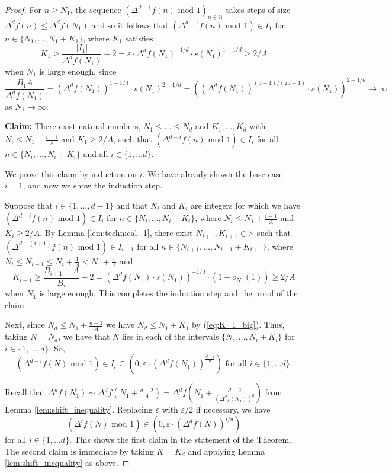\documentclass[12pt]{article}
\theoremstyle{plain} %
\theoremstyle{definition} %
\theoremstyle{plain}
\theoremstyle{plain}
\numberwithin{equation}{section}
\newcommand{\N}{\mathbb{N}}
\renewcommand{\epsilon}{\varepsilon}
\renewcommand{\leq}{\leqslant}
\renewcommand{\geq}{\geqslant}
\renewcommand{\subset}{\subseteq}
\newcommand{\1}{\mathbbm{1}}
\newcommand{\oo}{\infty}
\begin{document}
\begin{proof}
For $n\geq N_1$, the sequence $(\Delta^{d-1}f(n) \text{ mod } 1)_{n\in \N}$ takes steps of size $\Delta^{d}f(n)\leq \Delta^{d}f(N_1)$ and so it follows that $(\Delta^{d-1}f(n) \text{ mod } 1) \in I_{1}$ for $n\in \{N_1,\dots, N_1+K_1\}$, where $K_1$ satisfies
\begin{equation}\label{eq:K_1_big}
K_1\geq \frac{ |I_{1}|}{\Delta^{d}f(N_1)}-2 = \epsilon\cdot {\Delta^{d}f(N_1)^{-1/d}}\cdot s(N_1)^{1-1/d} \geq 2/ A
\end{equation}
when $N_1$ is large enough, since 
\[
\frac{B_1 A}{\Delta^{d}f(N_1)}= (\Delta^{d}f(N_1))^{1-1/d}\cdot s(N_1)^{2-1/d} = ((\Delta^{d}f(N_1))^{(d-1)/(2d-1)}\cdot s(N_1))^{2-1/d}\to \oo
\]
as $N_1\to\oo$.


\textbf{Claim:} There exist natural numbers, $N_1\leq \dots \leq N_{d}$ and $K_1,\dots, K_{d}$ with $N_{i}\leq N_1+\frac{i-1}{A}$ and $K_1\geq 2/A$, such that $(\Delta^{d-i}f(n)\text{ mod } 1)\in  I_{i}$ for all $n\in \{N_i,\dots, N_i+K_i\}$ and all $i\in\{1,\dots d\}$.


We prove this claim by induction on $i$. We have already shown the base case $i=1$, and now we show the induction step.

Suppose that $i\in\{1,\dots, d-1\}$ and that $N_i$ and $K_i$ are integers for which we have $(\Delta^{d-i}f(n) \text{ mod } 1) \in I_{i}$ for $n\in \{N_i,\dots, N_i+K_i\}$, where $N_i\leq N_{1}+\frac{i-1}{A}$ and $K_i\geq 2/A$. By Lemma \ref{lem:technical_1}, there exist $N_{i+1},K_{i+1}\in \N$ such that $(\Delta^{d-(i+1)}f(n) \text{ mod } 1) \in I_{i+1}$ for all $n\in\{N_{i+1},\dots, N_{i+1}+K_{i+1}\}$, where $N_i\leq N_{i+1}\leq N_{i}+\frac{1}{A}< N_{1}+\frac{i}{A}$ and 
\begin{equation}\label{eq:length_of_interval}
K_{i+1}\geq \frac{ B_{i+1}-A}{B_i}-2 =  \left(\Delta^{d}f(N_1)\cdot s(N_1)\right)^{-1/d} \cdot (1+o_{N_1}(1))\geq 2/A
\end{equation}
when $N_1$ is large enough. This completes the induction step and the proof of the claim. 


Next, since $N_{d}\leq N_1+\frac{d-1}{A}$ we have $N_{d}\leq N_1+K_1$ by (\ref{eq:K_1_big}). Thus, taking $N=N_{d}$, we have that $N$ lies in each of the intervals $\{N_i,\dots, N_i+K_i\}$ for $i\in \{1,\dots, d\}$. So,
\[
(\Delta^{d-i}f(N)\text{ mod } 1)\in I_i\subset(0,\epsilon\cdot (\Delta^{d}f(N_1))^{\frac{d-i}{d}}) \text{ for all }i\in\{1,\dots d\}.
\]

Recall that $\Delta^{d}f(N_1)\sim  \Delta^{d}f\left( N_1+\frac{d-2}{A}\right)=\Delta^{d}f\left( N_1+\frac{d-2}{(\Delta^{d}f(N_1))^{\eta}}\right)$ from Lemma \ref{lem:shift_inequality}. Replacing $\epsilon$ with $\epsilon/2$ if necessary, we have
\[
(\Delta^{i}f(N)\text{ mod } 1)\in (0,\epsilon\cdot (\Delta^{d}f(N))^{i/d})
\]
for all $i\in\{1,\dots d\}$. This shows the first claim in the statement of the Theorem. The second claim is immediate by taking $K = K_{d}$ and applying  Lemma \ref{lem:shift_inequality} as above.
\end{proof}
\end{document}
